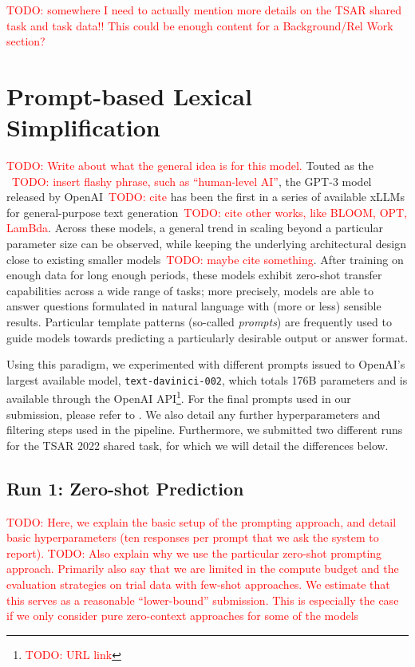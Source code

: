 \documentclass[11pt]{article}
\newcommand{\todo}[1]{\textcolor{red}{TODO: #1}}
\begin{document}
\todo{somewhere I need to actually mention more details on the TSAR shared task and task data!! This could be enough content for a Background/Rel Work section?}

\section{Prompt-based Lexical Simplification}
\todo{Write about what the general idea is for this model.}
Touted as the ~\todo{insert flashy phrase, such as ``human-level AI''}, the GPT-3 model released by OpenAI~\todo{cite} has been the first in a series of available xLLMs for general-purpose text generation~\todo{cite other works, like BLOOM, OPT, LamBda}. Across these models, a general trend in scaling beyond a particular parameter size can be observed, while keeping the underlying architectural design close to existing smaller models~\todo{maybe cite something}.
After training on enough data for long enough periods, these models exhibit zero-shot transfer capabilities across a wide range of tasks; more precisely, models are able to answer questions formulated in natural language with (more or less) sensible results. Particular template patterns (so-called \emph{prompts}) are frequently used to guide models towards predicting a particularly desirable output or answer format.

\noindent Using this paradigm, we experimented with different prompts issued to OpenAI's largest available model, \texttt{text-davinici-002}, which totals 176B parameters and is available through the OpenAI API\footnote{\todo{URL link}}.
For the final prompts used in our submission, please refer to . We also detail any further hyperparameters and filtering steps used in the pipeline.
Furthermore, we submitted two different runs for the TSAR 2022 shared task, for which we will detail the differences below.

\subsection{Run 1: Zero-shot Prediction}
\todo{Here, we explain the basic setup of the prompting approach, and detail basic hyperparameters (ten responses per prompt that we ask the system to report).}
\todo{Also explain why we use the particular zero-shot prompting approach. Primarily also say that we are limited in the compute budget and the evaluation strategies on trial data with few-shot approaches. We estimate that this serves as a reasonable ``lower-bound'' submission. This is especially the case if we only consider pure zero-context approaches for some of the models}
\end{document}
